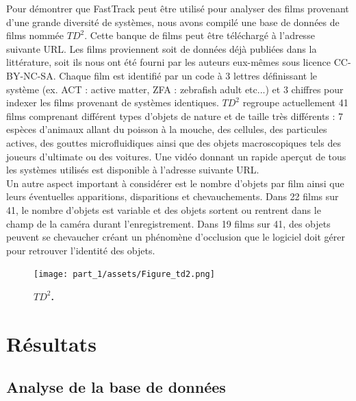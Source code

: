     Pour démontrer que FastTrack peut être utilisé pour analyser des films provenant d'une grande diversité de systèmes, nous avons compilé une base de données de films nommée $TD^2$. Cette banque de films peut être téléchargé à l'adresse suivante URL. Les films proviennent soit de données déjà publiées dans la littérature, soit ils nous ont été fourni par les auteurs eux-mêmes sous licence CC-BY-NC-SA. Chaque film est identifié par un code à 3 lettres définissant le système (ex. ACT : active matter, ZFA : zebrafish adult etc...) et 3 chiffres pour indexer les films provenant de systèmes identiques. $TD^2$ regroupe actuellement 41 films comprenant différent types d'objets de nature et de taille très différents : 7 espèces d'animaux allant du poisson à la mouche, des cellules, des particules actives, des gouttes microfluidiques ainsi que des objets macroscopiques tels des joueurs d'ultimate ou des voitures. Une vidéo donnant un rapide aperçut de tous les systèmes utilisés est disponible à l'adresse suivante URL.\\

    Un autre aspect important à considérer est le nombre d'objets par film ainsi que leurs éventuelles apparitions, disparitions et chevauchements. Dans 22 films sur 41, le nombre d'objets est variable et des objets sortent ou rentrent dans le champ de la caméra durant l'enregistrement. Dans 19 films sur 41, des objets peuvent se chevaucher créant un phénomène d'occlusion que le logiciel doit gérer pour retrouver l'identité des objets.

	\begin{figure}[h]
    \centering
    \texttt{[image: part\_1/assets/Figure\_td2.png]}    
    \caption{\textbf{$TD^2$.}}
    \label{part_1:fig_5}
    \end{figure}


\chapter{Résultats}

	\section{Analyse de la base de données}

